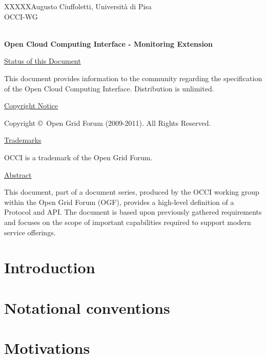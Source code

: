 \documentclass[10pt,a4paper]{article}
\newcommand{\doccode}{XXXXX}
\begin{document}
\thispagestyle{empty}

\doccode \hfill Augusto Ciuffoletti, Università di Pisa\\ 
OCCI-WG\\
\\

\vspace*{0.5in}

\begin{Large}
\textbf{Open Cloud Computing Interface - Monitoring Extension}
\end{Large}

\vspace*{0.5in}

\underline{Status of this Document}

This document provides information to the community regarding the
specification of the Open Cloud Computing Interface. Distribution is
unlimited.

\underline{Copyright Notice}

Copyright \copyright ~Open Grid Forum (2009-2011). All Rights Reserved.

\underline{Trademarks}

OCCI is a trademark of the Open Grid Forum.

\underline{Abstract}

This document, part of a document series, produced by the OCCI working
group within the Open Grid Forum (OGF), provides a high-level
definition of a Protocol and API. The document is based upon
previously gathered requirements and focuses on the scope of important
capabilities required to support modern service offerings.


\newpage
\tableofcontents
\newpage

\section{Introduction}


\section{Notational conventions}


\newcommand{\smx}{{\bf Notify}}
\newcommand{\ntfl}{{\bf Notification}}
\newcommand{\sens}{{\bf Sensor}}

\section{Motivations}
\end{document}

